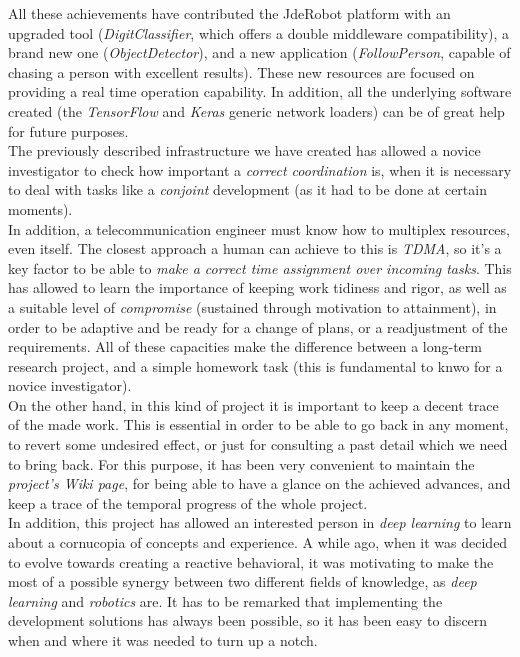 	All these achievements have contributed the JdeRobot platform with an upgraded tool (\emph{DigitClassifier}, which offers a double middleware compatibility), a brand new one (\emph{ObjectDetector}), and a new application (\emph{FollowPerson}, capable of chasing a person with excellent results). These new resources are focused on providing a real time operation capability. In addition, all the underlying software created (the \emph{TensorFlow} and \emph{Keras} generic network loaders) can be of great help for future purposes.\\
	
	
	The previously described infrastructure we have created has allowed a novice investigator to check how important a \emph{correct coordination} is, when it is necessary to deal with tasks like a \emph{conjoint} development (as it had to be done at certain moments).\\
	
	
	In addition, a telecommunication engineer must know how to multiplex resources, even itself. The closest approach a human can achieve to this is \emph{TDMA}, so it's a key factor to be able to \emph{make a correct time assignment over incoming tasks}. This has allowed to learn the importance of keeping work tidiness and rigor, as well as a suitable level of \emph{compromise} (sustained through motivation to attainment), in order to be adaptive and be ready for a change of plans, or a readjustment of the requirements. All of these capacities make the difference between a long-term research project, and a simple homework task (this is fundamental to knwo for a novice investigator).\\
	
	
	On the other hand, in this kind of project it is important to keep a decent trace of the made work. This is essential in order to be able to go back in any moment, to revert some undesired effect, or just for consulting a past detail which we need to bring back. For this purpose, it has been very convenient to maintain the \emph{project's Wiki page}, for being able to have a glance on the achieved advances, and keep a trace of the temporal progress of the whole project.\\
	
	
	In addition, this project has allowed an interested person in \emph{deep learning} to learn about a cornucopia of concepts and experience. A while ago, when it was decided to evolve towards creating a reactive behavioral, it was motivating to make the most of a possible synergy between two different fields of knowledge, as \emph{deep learning} and \emph{robotics} are. It has to be remarked that implementing the development solutions has always been possible, so it has been easy to discern when and where it was needed to turn up a notch.
	
